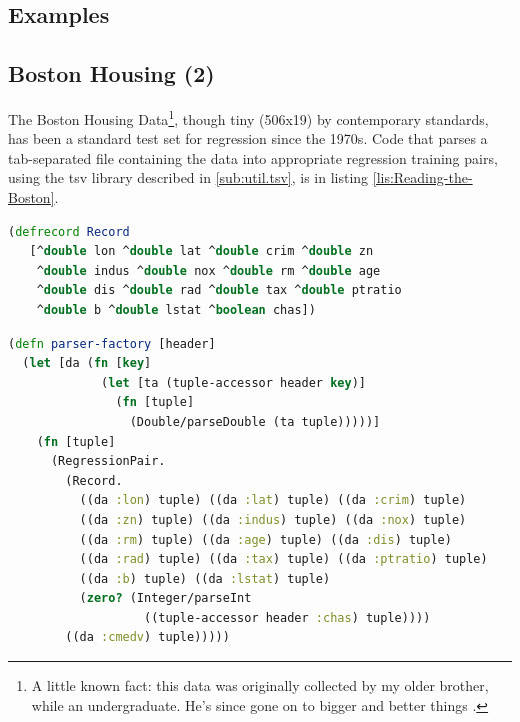 \documentclass[10pt,openany]{article}
\numberwithin{definition}{section}
\numberwithin{example}{section}
\numberwithin{equation}{section}
\numberwithin{figure}{section}
\begin{document}
\subsection{Examples}

\subsection{Boston Housing (2)}

The Boston Housing Data\footnote{A little known fact: this data was originally collected by my older
brother, while an undergraduate. He's since gone on to bigger and
better things \cite{BostonHousing}.}, though tiny (506x19) by contemporary standards, has been a standard
test set for regression since the 1970s. Code that parses a tab-separated
file containing the data into appropriate regression training pairs,
using the tsv library described in \autoref{sub:util.tsv}, is
in listing \ref{lis:Reading-the-Boston}.

\begin{minipage}[t]{1\columnwidth}%
\begin{lstlisting}[caption={Boston housing record class},label={lis:Reading-the-Boston},language=clojure,tabsize=2]
(defrecord Record
   [^double lon ^double lat ^double crim ^double zn 
    ^double indus ^double nox ^double rm ^double age 
    ^double dis ^double rad ^double tax ^double ptratio
    ^double b ^double lstat ^boolean chas]) 

\end{lstlisting}
%
\end{minipage}

\begin{minipage}[t]{1\columnwidth}%
\begin{lstlisting}[caption={Boston housing parser},label={lis:Reading-the-Boston-2},language=clojure,tabsize=2]
(defn parser-factory [header]
  (let [da (fn [key]
             (let [ta (tuple-accessor header key)] 
               (fn [tuple] 
                 (Double/parseDouble (ta tuple)))))]
    (fn [tuple]
      (RegressionPair.
        (Record.
          ((da :lon) tuple) ((da :lat) tuple) ((da :crim) tuple)
          ((da :zn) tuple) ((da :indus) tuple) ((da :nox) tuple)
          ((da :rm) tuple) ((da :age) tuple) ((da :dis) tuple)
          ((da :rad) tuple) ((da :tax) tuple) ((da :ptratio) tuple)
          ((da :b) tuple) ((da :lstat) tuple) 
          (zero? (Integer/parseInt 
                   ((tuple-accessor header :chas) tuple))))
        ((da :cmedv) tuple)))))
\end{lstlisting}
%
\end{minipage}
\end{document}
